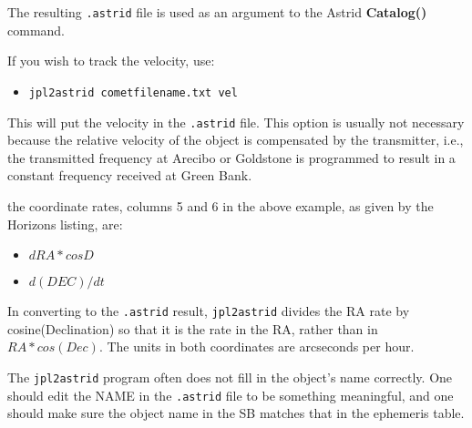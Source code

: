 The resulting {\tt.astrid} file is used as an argument to the \gls{Astrid}
{\bfseries{\textcolor{pythonKeywords}{Catalog}}()} command.

\newpage

\noindent If you wish to track the velocity, use:
\begin{itemize}
 \item {\tt jpl2astrid cometfilename.txt vel}
 \end{itemize}
This will put the velocity in the {\tt.astrid} file.  This option is usually
not necessary because the relative velocity of the object is compensated by
the transmitter, i.e., the transmitted frequency at Arecibo or Goldstone is
programmed to result in a constant frequency received at Green Bank.

 the coordinate rates, columns 5 and 6 in the above
example, as given by the Horizons listing, are:
\begin{itemize}
\item $dRA*cosD$
\item $d(DEC)/dt$
\end{itemize}
In converting to the {\tt.astrid} result, {\tt jpl2astrid} divides the RA rate by
cosine(Declination) so that it is the rate in the RA, rather than in
$RA*cos(Dec)$.  The units in both coordinates are arcseconds per hour.

The {\tt jpl2astrid} program often does not fill in the object's name correctly.
One should edit the NAME in the {\tt .astrid} file to be something meaningful,
and one should make sure the object name in the \gls{SB} matches that in
the ephemeris table.

